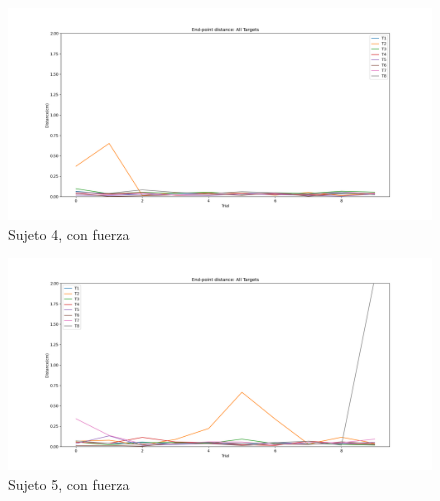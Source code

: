 \documentclass[a4paper,11pt, oneside]{book}
\begin{document}
\begin{figure}[H]
	\includegraphics[width=\linewidth]{sujeto4/force/evolution_distance}
	\caption{Sujeto 4, con fuerza}
	\label{4-2-2}
\end{figure}
\begin{figure}[H]
	\includegraphics[width=\linewidth]{sujeto5/force/evolution_distance}
	\caption{Sujeto 5, con fuerza}
	\label{5-2-2}
\end{figure}
\end{document}
